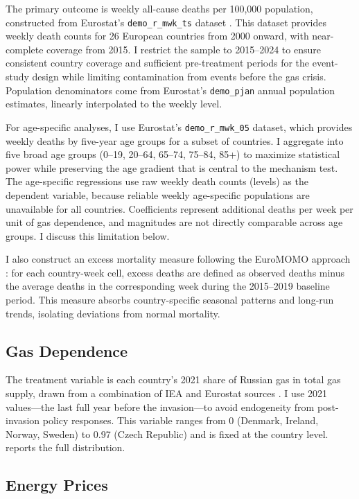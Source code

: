 \documentclass[12pt]{article}
\begin{document}
The primary outcome is weekly all-cause deaths per 100,000 population, constructed from Eurostat's \texttt{demo\_r\_mwk\_ts} dataset \citep{eurostat2023}. This dataset provides weekly death counts for 26 European countries from 2000 onward, with near-complete coverage from 2015. I restrict the sample to 2015--2024 to ensure consistent country coverage and sufficient pre-treatment periods for the event-study design while limiting contamination from events before the gas crisis. Population denominators come from Eurostat's \texttt{demo\_pjan} annual population estimates, linearly interpolated to the weekly level.

For age-specific analyses, I use Eurostat's \texttt{demo\_r\_mwk\_05} dataset, which provides weekly deaths by five-year age groups for a subset of countries. I aggregate into five broad age groups (0--19, 20--64, 65--74, 75--84, 85+) to maximize statistical power while preserving the age gradient that is central to the mechanism test. The age-specific regressions use raw weekly death counts (levels) as the dependent variable, because reliable weekly age-specific populations are unavailable for all countries. Coefficients represent additional deaths per week per unit of gas dependence, and magnitudes are not directly comparable across age groups. I discuss this limitation below.

I also construct an excess mortality measure following the EuroMOMO approach \citep{euromomo2023}: for each country-week cell, excess deaths are defined as observed deaths minus the average deaths in the corresponding week during the 2015--2019 baseline period. This measure absorbs country-specific seasonal patterns and long-run trends, isolating deviations from normal mortality.

\subsection{Gas Dependence}

The treatment variable is each country's 2021 share of Russian gas in total gas supply, drawn from a combination of IEA and Eurostat sources \citep{iea2022, stern2022}. I use 2021 values---the last full year before the invasion---to avoid endogeneity from post-invasion policy responses. This variable ranges from 0 (Denmark, Ireland, Norway, Sweden) to 0.97 (Czech Republic) and is fixed at the country level.  reports the full distribution.

\subsection{Energy Prices}
\end{document}
